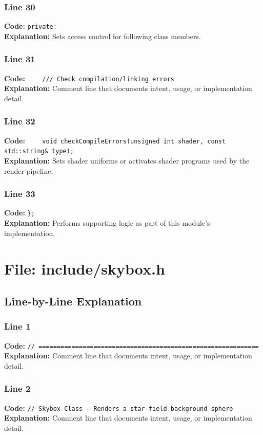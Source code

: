 \documentclass[11pt,a4paper]{article}
\begin{document}
\subsubsection*{Line 30}
\textbf{Code:} \verb|private:|\\
\textbf{Explanation:} Sets access control for following class members.

\subsubsection*{Line 31}
\textbf{Code:} \verb|    /// Check compilation/linking errors|\\
\textbf{Explanation:} Comment line that documents intent, usage, or implementation detail.

\subsubsection*{Line 32}
\textbf{Code:} \verb|    void checkCompileErrors(unsigned int shader, const std::string& type);|\\
\textbf{Explanation:} Sets shader uniforms or activates shader programs used by the render pipeline.

\subsubsection*{Line 33}
\textbf{Code:} \verb|};|\\
\textbf{Explanation:} Performs supporting logic as part of this module's implementation.

\newpage
\section{File: include/skybox.h}
\subsection{Line-by-Line Explanation}
\subsubsection*{Line 1}
\textbf{Code:} \verb|// ============================================================|\\
\textbf{Explanation:} Comment line that documents intent, usage, or implementation detail.

\subsubsection*{Line 2}
\textbf{Code:} \verb|// Skybox Class - Renders a star-field background sphere|\\
\textbf{Explanation:} Comment line that documents intent, usage, or implementation detail.
\end{document}
